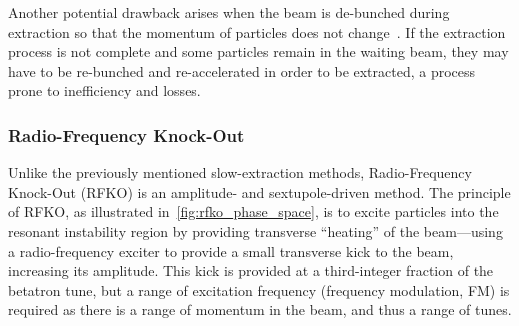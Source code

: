 \documentclass[11pt]{report}
\begin{document}
Another potential drawback arises when the beam is de-bunched during extraction so that the momentum of particles does not change~\cite{brown:ripples}. If the extraction process is not complete and some particles remain in the waiting beam, they may have to be re-bunched and re-accelerated in order to be extracted, a process prone to inefficiency and losses.

\subsubsection{Radio-Frequency Knock-Out}

Unlike the previously mentioned slow-extraction methods, Radio-Frequency Knock-Out (RFKO) is an amplitude- and sextupole-driven method. The principle of RFKO, as illustrated in~\autoref{fig:rfko_phase_space}, is to excite particles into the resonant instability region by providing transverse ``heating'' of the beam---using a radio-frequency exciter to provide a small transverse kick to the beam, increasing its amplitude. This kick is provided at a third-integer fraction of the betatron tune, but a range of excitation frequency (frequency modulation, FM) is required as there is a range of momentum in the beam, and thus a range of tunes. 
\end{document}
